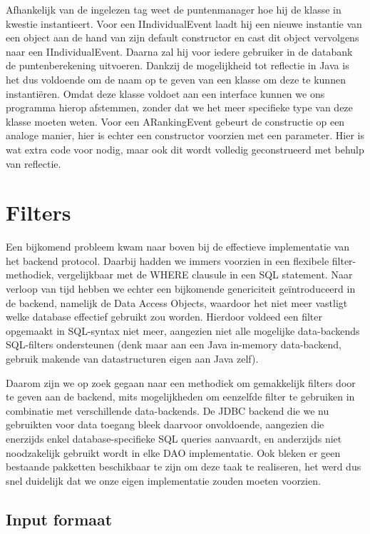 Afhankelijk van de ingelezen tag weet de puntenmanager hoe hij de klasse in kwestie instantieert. Voor een IIndividualEvent laadt hij een nieuwe instantie van een object aan de hand van zijn default constructor en cast dit object vervolgens naar een IIndividualEvent. Daarna zal hij voor iedere gebruiker in de databank de puntenberekening uitvoeren. Dankzij de mogelijkheid tot reflectie in Java is het dus voldoende om de naam op te geven van een klasse om deze te kunnen instanti\"eren. Omdat deze klasse voldoet aan een interface kunnen we ons programma hierop afstemmen, zonder dat we het meer specifieke type van deze klasse moeten weten. Voor een ARankingEvent gebeurt de constructie op een analoge manier, hier is echter een constructor voorzien met een parameter. Hier is wat extra code voor nodig, maar ook dit wordt volledig geconstrueerd met behulp van reflectie.

%
%

\chapter{Filters}

Een bijkomend probleem kwam naar boven bij de effectieve implementatie van het backend protocol. Daarbij hadden we immers voorzien in een flexibele filter-methodiek, vergelijkbaar met de WHERE clausule in een SQL statement.
Naar verloop van tijd hebben we echter een bijkomende genericiteit ge\"introduceerd in de backend, namelijk de Data Access Objects, waardoor het niet meer vastligt welke database effectief gebruikt zou worden. Hierdoor voldeed een filter opgemaakt in SQL-syntax niet meer, aangezien niet alle mogelijke data-backends SQL-filters ondersteunen (denk maar aan een Java in-memory data-backend, gebruik makende van datastructuren eigen aan Java zelf).

Daarom zijn we op zoek gegaan naar een methodiek om gemakkelijk filters door te geven aan de backend, mits mogelijkheden om eenzelfde filter te gebruiken in combinatie met verschillende data-backends. De JDBC backend die we nu gebruikten voor data toegang bleek daarvoor onvoldoende, aangezien die enerzijds enkel database-specifieke SQL queries aanvaardt, en anderzijds niet noodzakelijk gebruikt wordt in elke DAO implementatie. Ook bleken er geen bestaande pakketten beschikbaar te zijn om deze taak te realiseren, het werd dus snel duidelijk dat we onze eigen implementatie zouden moeten voorzien.


\section{Input formaat}

